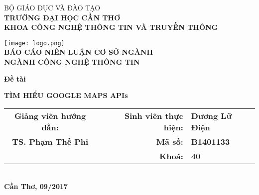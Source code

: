 \documentclass[../thesis.tex]{subfiles}
\begin{document}
\begin{titlepage}

\begin{center}

BỘ GIÁO DỤC VÀ ĐÀO TẠO\\
\textbf{TRƯỜNG ĐẠI HỌC CẦN THƠ\\}
\textbf{KHOA CÔNG NGHỆ THÔNG TIN VÀ TRUYỀN THÔNG\\[1cm]}

\texttt{[image: logo.png]}\\[1cm]

\textbf{BÁO CÁO NIÊN LUẬN CƠ SỞ NGÀNH\\}
\textbf{NGÀNH CÔNG NGHỆ THÔNG TIN\\[2cm]}

\begin{large}
\textbf{Đề tài\\[0.5cm]}
\end{large}
\textbf{{\LARGE TÌM HIỂU GOOGLE MAPS APIs}}
\\[4cm]

\begin{tabular}{ c c r l }
 \textbf{Giảng viên hướng dẫn:} & & \textbf{Sinh viên thực hiện:} & \textbf{Dương Lữ Điện}\\ 
 \textbf{TS. Phạm Thế Phi} & & \textbf{Mã số:} & \textbf{B1401133}\\  
 & & \textbf{Khoá:} & \textbf{40}    
\end{tabular}
\\[4cm]

\textbf{Cần Thơ, 09/2017}

\end{center}

\end{titlepage}
\end{document}
